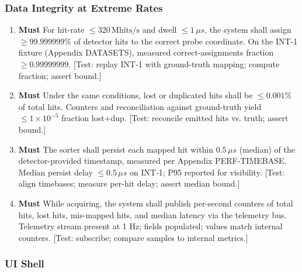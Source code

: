 \documentclass[10pt]{article}
\newcommand{\PriorityTag}[2]{%
  \colorbox{#2!25}{\footnotesize\textsf{\textbf{#1}}}\hspace{0.6em}}
\newcommand{\must}{\leavevmode\PriorityTag{Must}{green}}
\newcounter{reqgrp}[section] %
\newcounter{reqno}
\newcommand{\reqprefix}{GEN}
\newenvironment{requirements}[1]{%
  \renewcommand{\reqprefix}{#1}%
  \refstepcounter{reqgrp}%
  \setcounter{reqno}{0}%
  \begin{enumerate}[leftmargin=*]
}{\end{enumerate}}
\begin{document}
\subsubsection{Data Integrity at Extreme Rates}
\begin{requirements}{INT}

\item \must {}
  {For hit-rate \(\le 320\,\mathrm{Mhits/s}\) and dwell \(\le 1\,\mu s\), the system shall assign \(\ge 99.999999\%\) of detector hits to the correct probe coordinate.}
  {On the INT-1 fixture (Appendix DATASETS), measured correct-assignments fraction \(\ge 0.99999999\).}
  [Test: replay INT-1 with ground-truth mapping; compute fraction; assert bound.]

\item \must {}
  {Under the same conditions, lost or duplicated hits shall be \(\le 0.001\%\) of total hits.}
  {Counters and reconciliation against ground-truth yield \(\le 1\times10^{-5}\) fraction lost+dup.}
  [Test: reconcile emitted hits vs. truth; assert bound.]

\item \must {}
  {The sorter shall persist each mapped hit within \(0.5\,\mu s\) (median) of the detector-provided timestamp, measured per Appendix PERF-TIMEBASE.}
  {Median persist delay \(\le 0.5\,\mu s\) on INT-1; P95 reported for visibility.}
  [Test: align timebases; measure per-hit delay; assert median bound.]

\item \must {}
  {While acquiring, the system shall publish per-second counters of total hits, lost hits, mis-mapped hits, and median latency via the telemetry bus.}
  {Telemetry stream present at 1 Hz; fields populated; values match internal counters.}
  [Test: subscribe; compare samples to internal metrics.]

\end{requirements}

\subsubsection{UI Shell}
\end{document}
